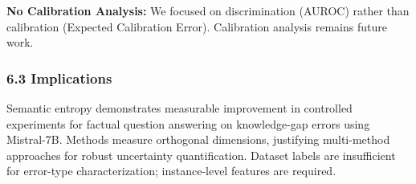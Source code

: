 \textbf{No Calibration Analysis:} We focused on discrimination (AUROC) rather than calibration (Expected Calibration Error). Calibration analysis remains future work.

\subsubsection{6.3 Implications}

Semantic entropy demonstrates measurable improvement in controlled experiments for factual question answering on knowledge-gap errors using Mistral-7B. Methods measure orthogonal dimensions, justifying multi-method approaches for robust uncertainty quantification. Dataset labels are insufficient for error-type characterization; instance-level features are required.
